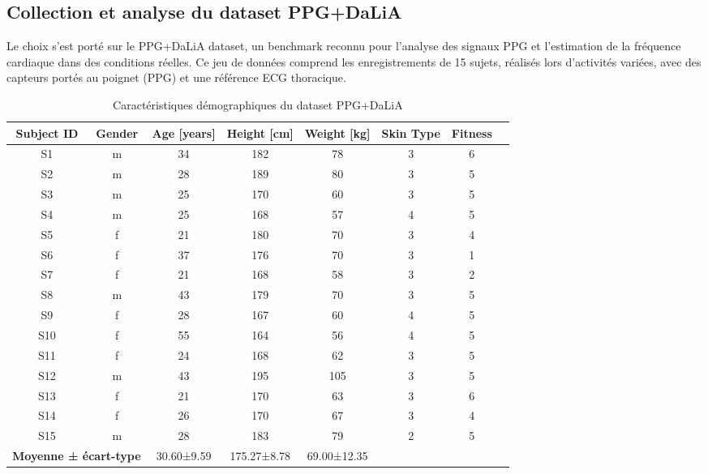 \subsection{Collection et analyse du dataset PPG+DaLiA}

Le choix s'est porté sur le PPG+DaLiA dataset, un benchmark reconnu pour l'analyse des signaux PPG et l'estimation de la fréquence cardiaque dans des conditions réelles. Ce jeu de données comprend les enregistrements de 15 sujets, réalisés lors d'activités variées, avec des capteurs portés au poignet (PPG) et une référence ECG thoracique.

\begin{table}[H]
    \centering
    \begin{tabular}{cccccccc}
        \hline
        \textbf{Subject ID} & \textbf{Gender} & \textbf{Age [years]} & \textbf{Height [cm]} & \textbf{Weight [kg]} & \textbf{Skin Type} & \textbf{Fitness} \\
        \hline
        S1  & m & 34 & 182 & 78  & 3 & 6 \\
        S2  & m & 28 & 189 & 80  & 3 & 5 \\
        S3  & m & 25 & 170 & 60  & 3 & 5 \\
        S4  & m & 25 & 168 & 57  & 4 & 5 \\
        S5  & f & 21 & 180 & 70  & 3 & 4 \\
        S6  & f & 37 & 176 & 70  & 3 & 1 \\
        S7  & f & 21 & 168 & 58  & 3 & 2 \\
        S8  & m & 43 & 179 & 70  & 3 & 5 \\
        S9  & f & 28 & 167 & 60  & 4 & 5 \\
        S10 & f & 55 & 164 & 56  & 4 & 5 \\
        S11 & f & 24 & 168 & 62  & 3 & 5 \\
        S12 & m & 43 & 195 & 105 & 3 & 5 \\
        S13 & f & 21 & 170 & 63  & 3 & 6 \\
        S14 & f & 26 & 170 & 67  & 3 & 4 \\
        S15 & m & 28 & 183 & 79  & 2 & 5 \\
        \hline
        \multicolumn{2}{c}{\textbf{Moyenne ± écart-type}} & 30.60±9.59 & 175.27±8.78 & 69.00±12.35 & & \\
        \hline
    \end{tabular}
    \caption{Caractéristiques démographiques du dataset PPG+DaLiA}
\end{table}

